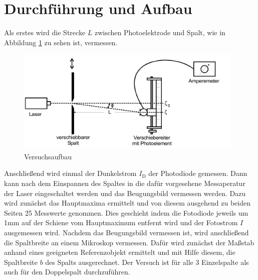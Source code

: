 \section{Durchführung und Aufbau}
\label{sec:Durchführung}
Als erstes wird die Strecke $L$ zwischen Photoelektrode und Spalt, wie in Abbildung \ref{fig:aufbau} zu sehen ist, vermessen.
\begin{figure}
  \centering
  \includegraphics[height=5cm]{picture/Aufbau.png}
  \caption{Versuchsaufbau}
  \label{fig:aufbau}
\end{figure}
Anschließend wird einmal der Dunkelstrom $I_\text{D}$ der Photodiode gemessen. Dann kann nach dem Einspannen des Spaltes in die dafür vorgesehene Messaperatur der Laser eingeschaltet werden und das Beugungsbild vermessen werden. Dazu wird zunächst das Hauptmaxima ermittelt und von diesem ausgehend zu beiden Seiten 25 Messwerte genommen. Dies geschieht indem die Fotodiode jeweils um 1mm auf der Schiene vom Hauptmaximum entfernt wird und der Fotostrom $I$ ausgemessen wird.
Nachdem das Beugungsbild vermessen ist, wird anschließend die Spaltbreite an einem Mikroskop vermessen. Dafür wird zunächst der Maßstab anhand eines geeigneten Referenzobjekt ermittelt und mit Hilfe diesem, die Spaltbreite $b$ des Spalts ausgerechnet. Der Versuch ist für alle 3 Einzelspalte als auch für den Doppelspalt durchzuführen.
